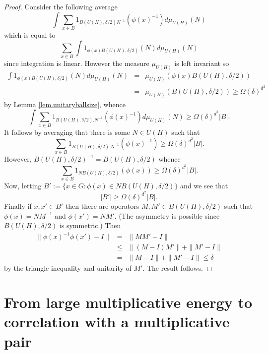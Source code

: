 \documentclass[12pt]{amsart}
\numberwithin{equation}{section}
\theoremstyle{plain}
\theoremstyle{definition}
\renewcommand{\leq}{\leqslant}
\renewcommand{\geq}{\geqslant}
\begin{document}
\begin{proof}
Consider the following average
\begin{equation*}
\int{\sum_{x \in B}{1_{B(U(H),\delta/2)N^{-1}}(\phi(x)^{-1})}d\mu_{U(H)}(N)}
\end{equation*}
which is equal to
\begin{equation*}
 \sum_{ x \in B}{\int{1_{\phi(x)B(U(H),\delta/2)}(N)d\mu_{U(H)}(N)}}
\end{equation*}
since integration is linear.  However the measure $\mu_{U(H)}$ is left invariant so 
\begin{eqnarray*}
\int{1_{\phi(x)B(U(H),\delta/2)}(N)d\mu_{U(H)}(N)}&=&\mu_{U(H)}(\phi(x)B(U(H),\delta/2)) \\&= &\mu_{U(H)}(B(U(H),\delta/2)) \geq \Omega(\delta)^{d^2}
\end{eqnarray*}
by Lemma \ref{lem.unitaryballsize}, whence
\begin{equation*}
\int{\sum_{x \in B}{1_{B(U(H),\delta/2).N^{-1}}(\phi(x)^{-1})}d\mu_{U(H)}(N)}\geq \Omega(\delta)^{d^2}|B|.
\end{equation*}
It follows by averaging that there is some $N \in U(H)$ such that
\begin{equation*}
\sum_{x \in B}{1_{B(U(H),\delta/2).N^{-1}}(\phi(x)^{-1})}\geq \Omega(\delta)^{d^2}|B|.
\end{equation*}
However, $B(U(H),\delta/2)^{-1}=B(U(H),\delta/2)$ whence
\begin{equation*}
\sum_{x \in B}{1_{NB(U(H),\delta/2)}(\phi(x))}\geq \Omega(\delta)^{d^2}|B|.
\end{equation*}
Now, letting $B':=\{x \in G: \phi(x) \in NB(U(H),\delta/2)\}$ and we see that
\begin{equation*}
|B'| \geq \Omega(\delta)^{d^2}|B|.
\end{equation*}
Finally if $x,x' \in B'$ then there are operators $M,M' \in B(U(H),\delta/2)$ such that $\phi(x)=NM^{-1}$ and $\phi(x') = NM'$.  (The asymmetry is possible since $B(U(H),\delta/2)$ is symmetric.)  Then
\begin{eqnarray*}
\|\phi(x)^{-1}\phi(x') - I\|& = &\|MM' - I\| \\ & \leq & \|(M-I)M'\| + \|M'-I\|\\ & = & \|M-I\| + \|M'-I\|\leq \delta
\end{eqnarray*}
by the triangle inequality and unitarity of $M'$.  The result follows.
\end{proof}

\section{From large multiplicative energy to correlation with a multiplicative pair}\label{sec.bog}
\end{document}
